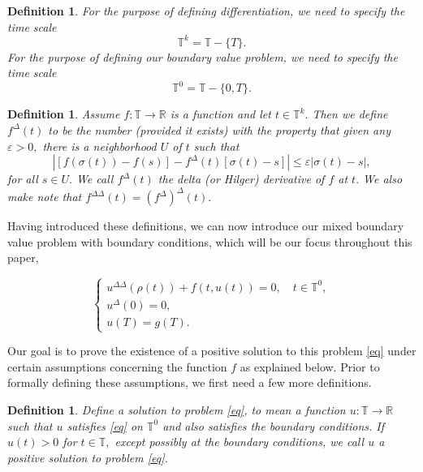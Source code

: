 \documentclass[12pt,reqno]{amsart}
\newtheorem{definition}[theorem]{Definition}
\begin{document}
\begin{definition}
	For the purpose of defining differentiation, we need to specify the time scale $$\mathbb{T}^k = \mathbb{T} - \{ T \}.$$
	For the purpose of defining our boundary value problem, we need to specify the time scale $$\mathbb{T}^0 = \mathbb{T} - \{ 0,T \}.$$
\end{definition}

\begin{definition}
	Assume $f: \mathbb{T} \rightarrow \mathbb{R}$ is a function and let $t \in \mathbb{T}^k.$  Then we define $f^{\Delta}(t)$ to be the number (provided it exists) with the property that given any $\varepsilon > 0,$ there is a neighborhood $U$ of $t$ such that $$\left|[f(\sigma(t)) - f(s)] - f^{\Delta}(t)[\sigma(t) - s]\right| \leq \varepsilon |\sigma(t) - s|,$$ for all $s \in U.$  We call $f^{\Delta}(t)$ the delta (or Hilger) derivative of $f$ at $t.$  We also make note that $f^{\Delta \Delta}(t) = (f^{\Delta})^{\Delta}(t).$
\end{definition}

Having introduced these definitions, we can now introduce our mixed boundary value problem with boundary conditions,  which will be our focus throughout this paper, 

\begin{equation}\label{eq}
\begin{cases}
u^{\Delta\Delta}(\rho(t)) + f(t, u(t)) = 0, \quad t \in \mathbb{T}^0,\\
u^{\Delta}(0) = 0, \\
u(T) = g(T).
\end{cases}
\end{equation}

Our goal is to prove the existence of a positive solution to this problem \eqref{eq} under certain assumptions concerning the function $f$ as explained below.  Prior to formally defining these assumptions, we first need a few more definitions.

\begin{definition}
	Define a solution to problem \eqref{eq}, to mean a function $u : \mathbb{T} \rightarrow \mathbb{R}$ such that $u$ satisfies \eqref{eq} on $\mathbb{T}^0$ and also satisfies the boundary conditions.  If $u(t) > 0$ for $t \in \mathbb{T},$ except possibly at the boundary conditions, we call $u$ a positive solution to problem \eqref{eq}.
\end{definition}
\end{document}
